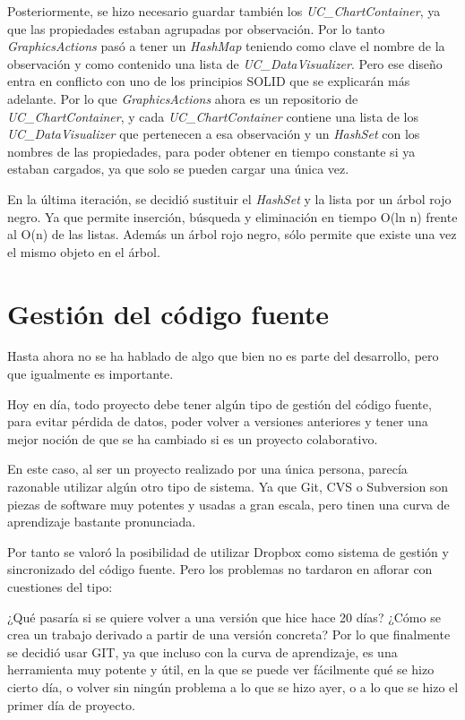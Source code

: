Posteriormente, se hizo necesario guardar tambi\'en los \emph{UC\_ChartContainer}, ya que las propiedades estaban agrupadas por
observaci\'on. Por lo tanto \emph{GraphicsActions} pas\'o a tener un \emph{HashMap} teniendo como clave el nombre de la 
observaci\'on
y como contenido una lista de \emph{UC\_DataVisualizer}. Pero ese dise\~no entra en conflicto con uno de los principios
SOLID que se explicar\'an m\'as adelante. Por lo que \emph{GraphicsActions} ahora es un repositorio de 
\emph{UC\_ChartContainer},
y cada \emph{UC\_ChartContainer} contiene una lista de los\emph{ UC\_DataVisualizer} que 
pertenecen a esa observaci\'on y un \emph{HashSet}
con los nombres de las propiedades, para poder obtener en tiempo constante si ya estaban cargados, ya que solo se pueden cargar
una \'unica vez.

En la \'ultima iteraci\'on, se decidi\'o sustituir el \emph{HashSet} y la lista por un \'arbol rojo negro. Ya que permite
inserci\'on, b\'usqueda y eliminaci\'on en tiempo O(ln n) frente al O(n) de las listas. 
Adem\'as un \'arbol rojo negro, s\'olo permite que existe una vez el mismo objeto en el \'arbol.

\section{Gesti\'{o}n del c\'{o}digo fuente}
Hasta ahora no se ha hablado de algo que bien no es parte del desarrollo, pero que igualmente es importante.

Hoy en d\'ia, todo proyecto debe tener alg\'un tipo de gesti\'on del c\'odigo fuente, para evitar p\'erdida de datos, 
poder volver a versiones anteriores y tener una mejor noci\'on de que se ha cambiado si es un proyecto colaborativo.

En este caso, al ser un proyecto realizado por una \'unica persona, parec\'ia razonable utilizar alg\'un otro tipo
de sistema. Ya que Git, CVS o Subversion son piezas de software muy potentes y usadas a gran escala, pero tinen
una curva de aprendizaje bastante pronunciada.

Por tanto se valor\'o la posibilidad de utilizar Dropbox como sistema de gesti\'on y sincronizado del c\'odigo fuente.
Pero los problemas no tardaron en aflorar con cuestiones del tipo:

¿Qu\'e pasar\'ia si se quiere volver a una versi\'on que hice hace 20 d\'ias? ¿C\'omo se crea un trabajo derivado a partir
de una versi\'on concreta? Por lo que finalmente se decidi\'o usar GIT, ya que incluso con la curva de aprendizaje,
es una herramienta muy potente y \'util, en la que se puede ver f\'acilmente qu\'e se hizo cierto d\'ia, o volver sin 
ning\'un problema a lo que se hizo ayer, o a lo que se hizo el primer d\'ia de proyecto.

